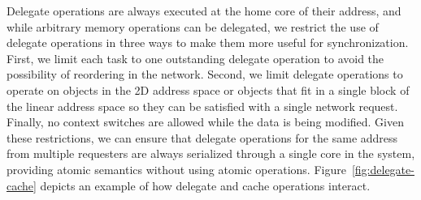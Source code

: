 Delegate operations are always executed at the home core of their address, and while arbitrary memory operations can be delegated, we restrict the use of delegate operations in three ways to make them more useful for synchronization. First, we limit each task to one outstanding delegate operation to avoid the possibility of reordering in the network. Second, we limit delegate operations to operate on objects in the 2D address space or objects that fit in a single block of the linear address space so they can be satisfied with a single network request. Finally, no context switches are allowed while the data is being modified. Given these restrictions, we can ensure that delegate operations for the same address from multiple requesters are always serialized through a single core in the system, providing atomic semantics without using atomic operations. Figure~\ref{fig:delegate-cache} depicts an example of how delegate and cache operations interact.

